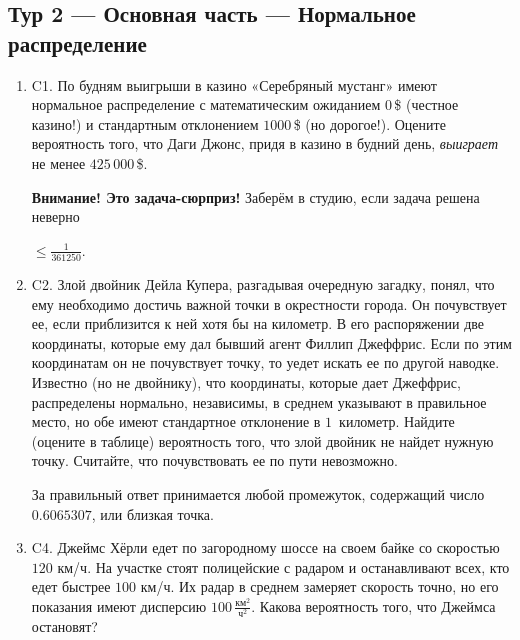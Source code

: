 \documentclass[12pt]{article}
\newenvironment{problem}{}{}
\newenvironment{sol}{}{} %
\begin{document}
\newpage
\subsection{Тур 2 — Основная часть — Нормальное распределение}

\begin{enumerate}
\begin{problem}
\item[C1.] По будням выигрыши в казино «Серебряный мустанг» имеют нормальное распределение с математическим ожиданием \(0\)\,\$ (честное казино!) и стандартным отклонением \(1000\)\,\$ (но дорогое!). Оцените вероятность того, что Даги Джонс, придя в казино в будний день, \textit{выиграет} не менее \(425\,000\)\,\$.

\begin{sol}
\textbf{Внимание! Это задача-сюрприз!} Заберём в студию, если задача решена неверно

$ \leq \frac{1}{361250} $.
\end{sol}
\end{problem}

\begin{problem}
\item[C2.] Злой двойник Дейла Купера, разгадывая очередную загадку, понял, что ему необходимо достичь важной точки в окрестности города. Он почувствует ее, если приблизится к ней хотя бы на километр. В его распоряжении две координаты, которые ему дал бывший агент Филлип Джеффрис. Если по этим координатам он не почувствует точку, то уедет искать ее по другой наводке. Известно (но не двойнику), что координаты, которые дает Джеффрис, распределены нормально, независимы, в среднем указывают в правильное место, но обе имеют стандартное отклонение в \(1\)~километр. Найдите (оцените в таблице) вероятность того, что злой двойник не найдет нужную точку. Считайте, что почувствовать ее по пути невозможно.

\begin{sol}
За правильный ответ принимается любой промежуток, содержащий число $0.6065307$, или близкая точка.
\end{sol}
\end{problem}

\begin{problem}
\item[C4.] Джеймс Хёрли едет по загородному шоссе на своем байке со скоростью \(120\) км/ч. На участке стоят полицейские с радаром и останавливают всех, кто едет быстрее \(100\) км/ч. Их радар в среднем замеряет скорость точно, но его показания имеют дисперсию $100\,\frac{\text{км}^2}{\text{ч}^2}$. Какова вероятность того, что Джеймса остановят?


\end{problem}
\end{enumerate}
\end{document}
